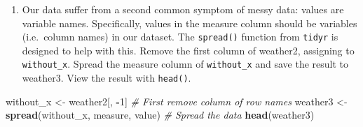\documentclass[]{article}
\newenvironment{Shaded}{\begin{snugshade}}{\end{snugshade}}
\newcommand{\KeywordTok}[1]{\textcolor[rgb]{0.13,0.29,0.53}{\textbf{#1}}}
\newcommand{\DecValTok}[1]{\textcolor[rgb]{0.00,0.00,0.81}{#1}}
\newcommand{\StringTok}[1]{\textcolor[rgb]{0.31,0.60,0.02}{#1}}
\newcommand{\CommentTok}[1]{\textcolor[rgb]{0.56,0.35,0.01}{\textit{#1}}}
\newcommand{\OperatorTok}[1]{\textcolor[rgb]{0.81,0.36,0.00}{\textbf{#1}}}
\newcommand{\NormalTok}[1]{#1}
\providecommand{\tightlist}{%
  \setlength{\itemsep}{0pt}\setlength{\parskip}{0pt}}
\begin{document}
\begin{enumerate}
\def\labelenumi{\arabic{enumi}.}
\setcounter{enumi}{3}
\tightlist
\item
  Our data suffer from a second common symptom of messy data: values are
  variable names. Specifically, values in the measure column should be
  variables (i.e.~column names) in our dataset. The \texttt{spread()}
  function from \texttt{tidyr} is designed to help with this. Remove the
  first column of weather2, assigning to \texttt{without\_x}. Spread the
  measure column of \texttt{without\_x} and save the result to weather3.
  View the result with \texttt{head()}.
\end{enumerate}

\begin{Shaded}
\begin{Highlighting}[]
\NormalTok{without_x <-}\StringTok{ }\NormalTok{weather2[, }\OperatorTok{-}\DecValTok{1}\NormalTok{] }\CommentTok{# First remove column of row names}
\NormalTok{weather3 <-}\StringTok{ }\KeywordTok{spread}\NormalTok{(without_x, measure, value) }\CommentTok{# Spread the data}
\KeywordTok{head}\NormalTok{(weather3)}
\end{Highlighting}
\end{Shaded}
\end{document}
